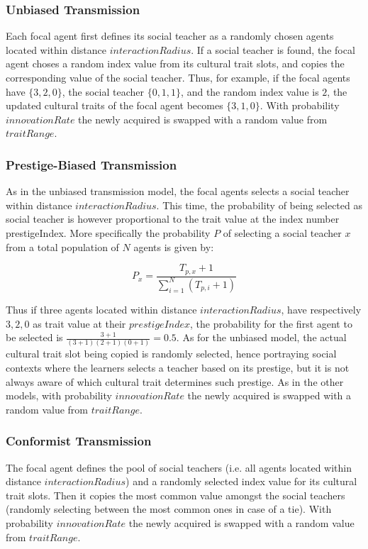 \documentclass[11pt,a4paper,twocolumn,notitlepage]{article}
\begin{document}
\subsubsection{Unbiased Transmission}

Each focal agent first defines its social teacher as a randomly chosen agents located within distance $interactionRadius$. If a social teacher is found, the focal agent choses a random index value from its cultural trait slots, and copies the corresponding value of the social teacher. Thus, for example, if the focal agents have $\{3,2,0\}$,  the social teacher $\{0,1,1\}$, and the random index value is $2$, the updated cultural traits of the focal agent becomes $\{3,1,0\}$. With probability $innovationRate$ the newly acquired is swapped with a random value from $traitRange$.

\subsubsection{Prestige-Biased Transmission}

As in the unbiased transmission model, the focal agents selects a social teacher within distance $interactionRadius$. This time, the probability of being selected as social teacher is however proportional to the trait value at the index number prestigeIndex. More specifically the probability $P$ of selecting a social teacher $x$ from a total population of $N$ agents is given by:

$$ P_x = \frac{T_{p,x}+1}{\sum\limits_{i=1}^{N}{(T_{p,i}+1)}} $$

Thus if three agents located within distance $interactionRadius$, have respectively ${3,2,0}$ as trait value at their $prestigeIndex$, the probability for the first agent to be selected is $ \frac{3+1}{(3+1)(2+1)(0+1)} = 0.5$. As for the unbiased model, the actual cultural trait slot being copied is randomly selected, hence portraying social contexts where the learners selects a teacher based on its prestige, but it is not always aware of which cultural trait determines such prestige.  As in the other models, with probability $innovationRate$ the newly acquired is swapped with a random value from $traitRange$.

\subsubsection{Conformist Transmission}

The focal agent defines the pool of social teachers (i.e. all agents located within distance $interactionRadius$) and a randomly selected index value for its cultural trait slots. Then it copies the most common value amongst the social teachers (randomly selecting between the most common ones in case of a tie). With probability $innovationRate$ the newly acquired is swapped with a random value from $traitRange$.
\end{document}
